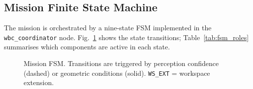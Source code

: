 \subsection{Mission Finite State Machine}

The mission is orchestrated by a nine-state \ac{FSM} implemented in the
\texttt{wbc\_coordinator} node. Fig.~\ref{fig:fsm} shows the state
transitions; Table~\ref{tab:fsm_roles} summarises which components are
active in each state.

\begin{figure}[t]
  \centering
  \resizebox{\textwidth}{!}{}
  \caption{Mission \ac{FSM}. Transitions are triggered by perception
           confidence (dashed) or geometric conditions (solid).
           \texttt{WS\_EXT} = workspace extension.}
  \label{fig:fsm}
\end{figure}

\begin{table}[t]
  \centering
  \caption{Component activation by mission phase. $\bullet$ = active,
           $\circ$ = idle, $-$ = not relevant.}
  \label{tab:fsm_roles}
\end{table}

